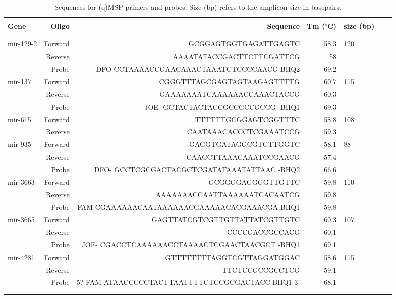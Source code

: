 \newpage
\begin{table}
{\scriptsize
\caption{Sequences for (q)MSP primers and probes. Size (bp) refers to the amplicon size in basepairs.}
\begin{tabular}{lrrrlll}
\hline
& & & & & & \\
\textbf{Gene}	&	\textbf{Oligo}	&	\textbf{Sequence} &	\textbf{Tm ($^{\circ}$C)} &	\textbf{size (bp)}\\
& & & & & &
\\
\hline
& & & & & &
\\
mir-129-2	&	Forward	&	GCGGAGTGGTGAGATTGAGTC  &	58.3	&	120\\
{}	&	Reverse	&	AAAATATACCGACTTCTTCGATTCG	&	58	&	{}\\
{}	&	Probe	&	DFO-CCTAAAACCGAACAAACTAAATCTCCCCAACG-BHQ2	&	69.2	&	{}\\
mir-137	&	Forward	&	CGGGTTTAGCGAGTAGTAAGAGTTTTG  &	60.7	&	115\\
{}	&	Reverse	&	GAAAAAAATCAAAAAACCAAACTACCG	&	60.3	&	{}\\
{}	&	Probe	&	JOE- GCTACTACTACCGCCGCCGCCG -BHQ1	&	69.3	&	{}\\
mir-615	&	Forward	&	TTTTTTGCGGAGTCGGTTTC  &	58.8	&	108\\
{}	&	Reverse	&	CAATAAACACCCTCGAAATCCG	&	59.3	&	{}\\
mir-935	&	Forward	&	GAGGTGATAGGCGTGTTGGTC  &	58.1	&	88\\
{}	&	Reverse	&	CAACCTTAAACAAATCCGAACG	&	57.4	&	{}\\
{}	&	Probe	&	DFO- GCCTCGCGACTACGCTCGATATAAATATTAAC -BHQ2	&	66.6	&	{}\\
mir-3663	&	Forward	&	GCGGGGAGGGGTTGTTC  &	59.8	&	110\\
{}	&	Reverse	&	AAAAAAACCAATTAAAAAATCACAATCG	&	59.8	&	{}\\
{}	&	Probe	&	FAM-CGAAAAAACAATAAAAAACGAAAAACACGAAACGA-BHQ1	&	59.8	&	{}\\
mir-3665	&	Forward	&	GAGTTATCGTCGTTGTTATTATCGTTGTC  &	60.3	&	107\\
{}	&	Reverse	&	CCCCGACCGCCACG	&	60.1	&	{}\\
{}	&	Probe	&	JOE- CGACCTCAAAAAACCTAAAACTCGAACTAACGCT -BHQ1	&	69.1	&	{}\\
mir-4281	&	Forward	&	GTTTTTTTTAGGTCGTTAGGATGGAC  & 	58.6	&	115\\
{}	&	Reverse	&	TTCTCCGCCGCCTCG	&	59.1	&	{}\\
{}	&	Probe	&	5?-FAM-ATAACCCCCTACTTAATTTTCTCCGCGACTACC-BHQ1-3'	&	68.1	&	{}\\

& & & & & &
\\
\hline & & & & & & \\
\end{tabular}
}
\label{tableSM:GEOdatasets}
\end{table}


